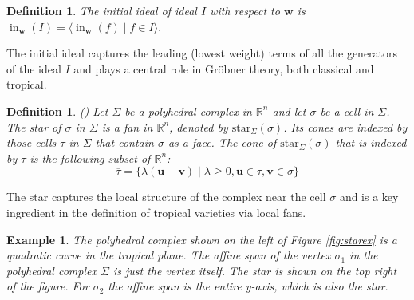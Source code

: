 \documentclass[11pt,reqno,a4paper]{article}
\theoremstyle{theoremstyle}
\theoremstyle{examplestyle}
\newtheorem{example}[theorem]{Example}
\newtheorem{definition}[theorem]{Definition}
\theoremstyle{algorithmstyle}
\numberwithin{equation}{subsection}
\newcommand{\RR}{\mathbb{R}}
\DeclareMathOperator{\initial}{in}
\begin{document}
\begin{definition}
    The initial ideal of ideal $I$ with respect to $\mathbf{w}$ is $\initial_{\mathbf{w}}(I) = \langle\initial_{\mathbf{w}}(f) \; | \; f \in I \rangle.$
\end{definition}

The initial ideal captures the leading (lowest weight) terms of all the generators of the ideal $I$ and plays a central role in Gröbner theory,
both classical and tropical.

\begin{definition}
    (\cite[Def. 2.3.6]{MS2015}) Let $\Sigma$ be a polyhedral complex in $\RR^n$ and let $\sigma$ be a cell in $\Sigma$. The \textit{star} of $\sigma$ in $\Sigma$ is a fan in $\RR^n$, denoted by $\text{star}_{\Sigma}(\sigma)$. Its cones are indexed by those cells $\tau$ in $\Sigma$ that contain $\sigma$ as a face. The cone of $\text{star}_{\Sigma}(\sigma)$ that is indexed by $\tau$ is the following subset of $\RR^n$: \[\overline{\tau} = \{\lambda(\mathbf{u} - \mathbf{v}) \; | \; \lambda\geq 0, \mathbf{u}\in\tau,\mathbf{v}\in\sigma \}\]
\end{definition}

The star captures the local structure of the complex near the cell $\sigma$ and is a key ingredient in the definition of tropical varieties via local fans.

\begin{example}
    The polyhedral complex shown on the left of Figure \ref{fig:starex} is a quadratic curve in the tropical plane. The affine span of the vertex $\sigma_1$ in the polyhedral complex $\Sigma$ is just the vertex itself. The star is shown on the top right of the figure. For $\sigma_2$ the affine span is the entire y-axis, which is also the star.
\end{example}
\end{document}
